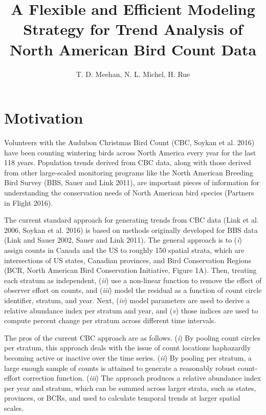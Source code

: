 \documentclass[]{article}
\title{A Flexible and Efficient Modeling Strategy for Trend Analysis of North American Bird Count Data}
\author{T. D. Meehan, N. L. Michel, H. Rue}
\begin{document}
\maketitle

\section{Motivation}
Volunteers with the Audubon Christmas Bird Count (CBC, Soykan et al. 2016) have been counting wintering birds across North America every year for the last 118 years. Population trends derived from CBC data, along with those derived from other large-scaled monitoring programs like the North American Breeding Bird Survey (BBS, Sauer and Link 2011), are important pieces of information for understanding the conservation needs of North American bird species (Partners in Flight 2016).

The current standard approach for generating trends from CBC data (Link et al. 2006, Soykan et al. 2016) is based on methods originally developed for BBS data (Link and Sauer 2002, Sauer and Link 2011). The general approach is to (\textit{i}) assign counts in Canada and the US to roughly 150 spatial strata, which are intersections of US states, Canadian provinces, and Bird Conservation Regions (BCR, North American Bird Conservation Initiative, Figure 1A). Then, treating each stratum as independent, (\textit{ii}) use a non-linear function to remove the effect of observer effort on counts, and (\textit{iii}) model the residual as a function of count circle identifier, stratum, and year. Next, (\textit{iv}) model parameters are used to derive a relative abundance index per stratum and year, and (\textit{v}) those indices are used to compute percent change per stratum across different time intervals.

The pros of the current CBC approach are as follows. (\textit{i}) By pooling count circles per stratum, this approach deals with the issue of count locations haphazardly becoming active or inactive over the time series. (\textit{ii}) By pooling per stratum, a large enough sample of counts is attained to generate a reasonably robust count-effort correction function. (\textit{iii}) The approach produces a relative abundance index per year and stratum, which can be summed across larger strata, such as states, provinces, or BCRs, and used to calculate temporal trends at larger spatial scales. 
\end{document}
